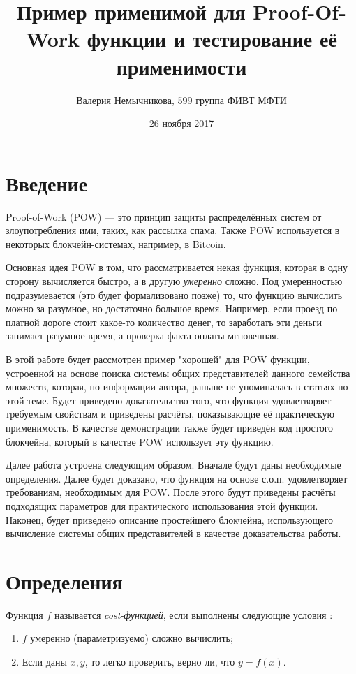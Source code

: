 \documentclass{article}
\title{Пример применимой для Proof-Of-Work функции и тестирование её применимости}
\date{26 ноября 2017}
\author{Валерия Немычникова, 599 группа ФИВТ МФТИ}
\begin{document}
\maketitle


\section{Введение}


    Proof-of-Work (POW) --- это принцип защиты распределённых систем от злоупотребления ими, таких, как рассылка спама. Также POW используется в некоторых блокчейн-системах, например, в Bitcoin. \cite{bitcoin}

    Основная идея POW в том, что рассматривается некая функция, которая в одну сторону вычисляется быстро, а в другую \textit{умеренно} сложно. Под умеренностью подразумевается (это будет формализовано позже) то, что функцию вычислить можно за разумное, но достаточно большое время. Например, если проезд по платной дороге стоит какое-то количество денег, то заработать эти деньги занимает разумное время, а проверка факта оплаты мгновенная.

    В этой работе будет рассмотрен пример "хорошей" для POW функции, устроенной на основе поиска системы общих представителей данного семейства множеств, которая, по информации автора, раньше не упоминалась в статьях по этой теме. Будет приведено доказательство того, что функция удовлетворяет требуемым свойствам и приведены расчёты, показывающие её практическую применимость. В качестве демонстрации также будет приведён код простого блокчейна, который в качестве POW использует эту функцию.

    Далее работа устроена следующим образом. Вначале будут даны необходимые определения. Далее будет доказано, что функция на основе с.о.п. удовлетворяет требованиям, необходимым для POW. После этого будут приведены расчёты подходящих параметров для практического использования этой функции. Наконец, будет приведено описание простейшего блокчейна, использующего вычисление системы общих представителей в качестве доказательства работы.
\section{Определения}

Функция $f$ называется \textit{cost-функцией}, если выполнены следующие условия \cite{hashcash}:
\begin{enumerate}
\item $f$ умеренно (параметризуемо) сложно вычислить;
\item Если даны $x, y$, то легко проверить, верно ли, что $y = f(x)$.

\end{enumerate}
\end{document}
